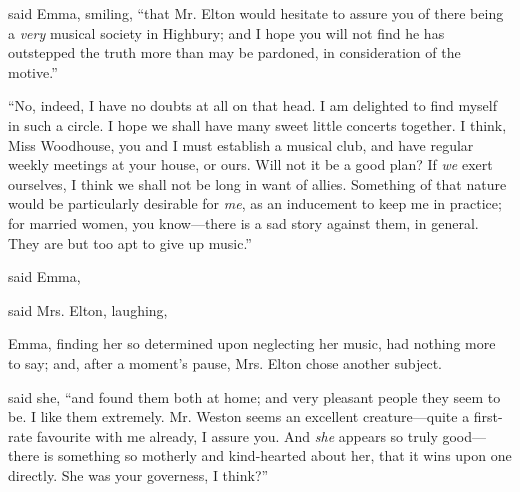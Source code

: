 said Emma, smiling, “that Mr. Elton would hesitate to assure you of there being a {\em very} musical society in Highbury; and I hope you will not find he has outstepped the truth more than may be pardoned, in consideration of the motive.”

“No, indeed, I have no doubts at all on that head. I am delighted to find myself in such a circle. I hope we shall have many sweet little concerts together. I think, Miss Woodhouse, you and I must establish a musical club, and have regular weekly meetings at your house, or ours. Will not it be a good plan? If {\em we} exert ourselves, I think we shall not be long in want of allies. Something of that nature would be particularly desirable for {\em me}, as an inducement to keep me in practice; for married women, you know---there is a sad story against them, in general. They are but too apt to give up music.”



 said Emma, 

 said Mrs. Elton, laughing, 

Emma, finding her so determined upon neglecting her music, had nothing more to say; and, after a moment's pause, Mrs. Elton chose another subject.

 said she, “and found them both at home; and very pleasant people they seem to be. I like them extremely. Mr. Weston seems an excellent creature---quite a first-rate favourite with me already, I assure you. And {\em she} appears so truly good---there is something so motherly and kind-hearted about her, that it wins upon one directly. She was your governess, I think?”


